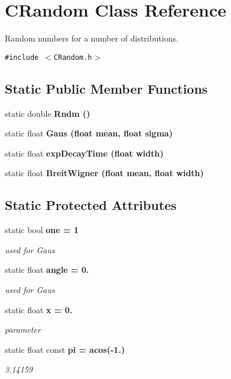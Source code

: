 \section{CRandom Class Reference}
\label{classCRandom}
Random numbers for a number of distributions.  


{\tt \#include $<$CRandom.h$>$}

\subsection*{Static Public Member Functions}
\begin{CompactItemize}
\item 
static double \bf{Rndm} ()
\item 
static float \bf{Gaus} (float mean, float sigma)
\item 
static float \bf{exp\-Decay\-Time} (float width)
\item 
static float \bf{Breit\-Wigner} (float mean, float width)
\end{CompactItemize}
\subsection*{Static Protected Attributes}
\begin{CompactItemize}
\item 
static bool \bf{one} = 1\label{classCRandom_0b76896418ae75089de37a3130e731bb}

\begin{CompactList}\small\item\em used for Gaus \item\end{CompactList}\item 
static float \bf{angle} = 0.\label{classCRandom_3745da4f06cb91d7f74827976d33c348}

\begin{CompactList}\small\item\em used for Gaus \item\end{CompactList}\item 
static float \bf{x} = 0.\label{classCRandom_976af97ef833bf86acf403f6227aa092}

\begin{CompactList}\small\item\em parameter \item\end{CompactList}\item 
static float const \bf{pi} = acos(-1.)\label{classCRandom_8532feb8274eff45ccb3a4336c612450}

\begin{CompactList}\small\item\em 3.14159 \item\end{CompactList}\end{CompactItemize}


